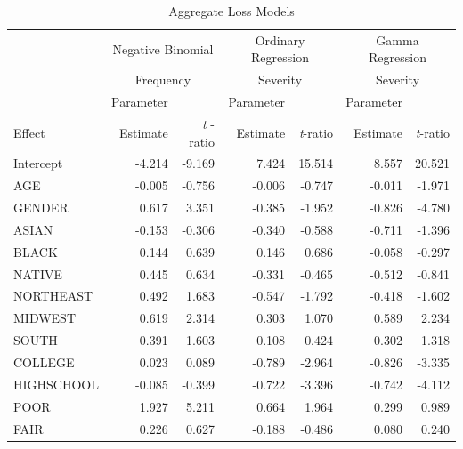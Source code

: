 \bigskip

\begin{table}[h]
\caption{\label{T16:16.4} Aggregate Loss Models} 
\begin{tabular}{l|rr|rrrr}
\hline & \multicolumn{2}{|c|}{Negative Binomial} &
\multicolumn{2}{|c}{Ordinary
Regression} & \multicolumn{2}{c}{Gamma Regression} \\
\multicolumn{1}{r|}{} & \multicolumn{2}{|c|}{Frequency} &
\multicolumn{2}{|c}{Severity} & \multicolumn{2}{c}{Severity} \\
\multicolumn{1}{r|}{} & \multicolumn{1}{|r}{Parameter} &  & Parameter &  &
Parameter &  \\
\multicolumn{1}{l|}{Effect} & \multicolumn{1}{|r}{Estimate} &
\textit{t} -ratio & Estimate & \textit{t}-ratio & Estimate &
\textit{t}-ratio
\\ \hline  Intercept &     -4.214 &     -9.169 &      7.424 &     15.514 &      8.557 &     20.521 \\
       AGE &     -0.005 &     -0.756 &     -0.006 &     -0.747 &     -0.011 &     -1.971 \\
    GENDER &      0.617 &      3.351 &     -0.385 &     -1.952 &     -0.826 &     -4.780 \\
     ASIAN &     -0.153 &     -0.306 &     -0.340 &     -0.588 &     -0.711 &     -1.396 \\
     BLACK &      0.144 &      0.639 &      0.146 &      0.686 &     -0.058 &     -0.297 \\
    NATIVE &      0.445 &      0.634 &     -0.331 &     -0.465 &     -0.512 &     -0.841 \\
 NORTHEAST &      0.492 &      1.683 &     -0.547 &     -1.792 &     -0.418 &     -1.602 \\
   MIDWEST &      0.619 &      2.314 &      0.303 &      1.070 &      0.589 &      2.234 \\
     SOUTH &      0.391 &      1.603 &      0.108 &      0.424 &      0.302 &      1.318 \\
     \hline
   COLLEGE &      0.023 &      0.089 &     -0.789 &     -2.964 &     -0.826 &     -3.335 \\
HIGHSCHOOL &     -0.085 &     -0.399 &     -0.722 &     -3.396 &     -0.742 &     -4.112 \\
\hline
      POOR &      1.927 &      5.211 &      0.664 &      1.964 &      0.299 &      0.989 \\
      FAIR &      0.226 &      0.627 &     -0.188 &     -0.486 &      0.080 &      0.240 \\

\end{tabular}
\end{table}
